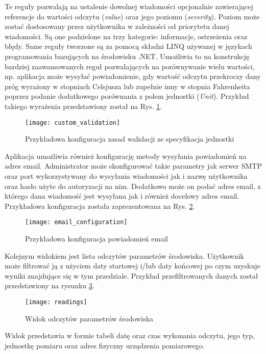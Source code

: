 Te reguły pozwalają na ustalenie dowolnej wiadomości opcjonalnie zawierającej referencje
do wartości odczytu (\textit{value}) oraz jego poziomu (\textit{severity}). Poziom może zostać
dostosowany przez użytkownika w zależności od priorytetu danej wiadomości.
Są one podzielone na trzy kategorie: informacje, ostrzeżenia oraz błędy.
Same reguły tworzone są za pomocą składni LINQ używanej w językach programowania
bazujących na środowisku .NET. Umożliwia to na konstrukcję bardziej zaawansowanych reguł
pozwalających na porównywanie wielu wartości, np. aplikacja może wysyłać powiadomienie, gdy
wartość odczytu przekroczy dany próg wyrażony w stopniach Celsjusza lub zupełnie inny
w stopnia Fahrenheita poprzez podanie dodatkowego porównania z polem jednostki (\textit{Unit}).
Przykład takiego wyrażenia przedstawiony został na Rys. \ref{atmosphere:custom_validation}.
\begin{figure}[h!]
  \centering
  \texttt{[image: custom\_validation]}
  \caption{Przykładowa konfiguracja zasad walidacji ze specyfikacja jednostki}
  \label{atmosphere:custom_validation}
\end{figure}
Aplikacja umożliwia również konfigurację metody wysyłania powiadomień na adres email.
Administrator może skonfigurować takie parametry jak serwer SMTP oraz port wykorzystywany
do wysyłania wiadomości jak i nazwę użytkownika oraz hasło użyte do autoryzacji na nim.
Dodatkowo może on podać adres email, z którego dana wiadomość jest wysyłana jak i również
docelowy adres email. Przykładowa konfiguracja została zaprezentowana na Rys. \ref{atmosphere:email_configuration}.
\begin{figure}[h!]
  \centering
  \texttt{[image: email\_configuration]}
  \caption{Przykładowa konfiguracja powiadomień email}
  \label{atmosphere:email_configuration}
\end{figure}

Kolejnym widokiem jest lista odczytów parametrów środowiska. Użytkownik może 
filtrować ją z użyciem daty startowej i/lub daty końcowej po czym uzyskuje
wyniki znajdujące się w tym przedziale. Przykład przefiltrowanych danych
został przedstawiony na rysunku \ref{atmosphere:readings}.
\begin{figure}[h!]
  \centering
  \texttt{[image: readings]}
  \caption{Widok odczytów parametrów środowiska}
  \label{atmosphere:readings}
\end{figure}
Widok przedstawia w formie tabeli datę oraz czas wykonania odczytu, jego typ,
jednostkę pomiaru oraz adres fizyczny urządzenia pomiarowego.

